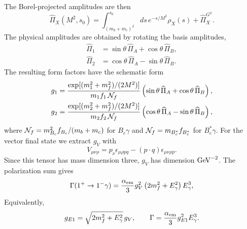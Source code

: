 \documentclass[aps,prd,preprint,nofootinbib,superscriptaddress]{revtex4-2}
\newcommand{\Bc}{B_c}
\newcommand{\Bcst}{B_c^\ast}
\begin{document}
\begin{table}[t]
\centering
\caption{Coefficients entering Eq.~\eqref{eq:rho-master}.  The labels \(P\)
and \(V\) denote the pseudoscalar and vector final state, respectively.}
\scriptsize
\setlength{\tabcolsep}{4pt}
\label{tab:rho-coeffs}
\end{table}

The Borel-projected amplitudes are then
\[
\widehat\Pi_X(M^2,s_0)=
\int_{(m_b+m_c)^2}^{s_0}ds\,e^{-s/M^2}\rho_X(s)+\widehat\Pi_X^{G^2}.
\]
The physical amplitudes are obtained by rotating the basis amplitudes,
\begin{align}
  \widehat\Pi_1 &= \sin\theta\,\widehat\Pi_A+\cos\theta\,\widehat\Pi_B,\\
  \widehat\Pi_2 &= \cos\theta\,\widehat\Pi_A-\sin\theta\,\widehat\Pi_B .
  \label{eq:rotate-pi}
\end{align}
The resulting form factors have the schematic form
\begin{align}
  g_1 &=
  \frac{\exp[(m_1^2+m_f^2)/(2M^2)]}{m_1 f_1\,{\cal N}_f}
  \left(\sin\theta\,\widehat\Pi_A+\cos\theta\,\widehat\Pi_B\right),\\
  g_2 &=
  \frac{\exp[(m_2^2+m_f^2)/(2M^2)]}{m_2 f_2\,{\cal N}_f}
  \left(\cos\theta\,\widehat\Pi_A-\sin\theta\,\widehat\Pi_B\right),
  \label{eq:sumrule-form}
\end{align}
where \({\cal N}_f=m_{\Bc}^2 f_{\Bc}/(m_b+m_c)\) for \(\Bc\gamma\) and
\({\cal N}_f=m_{\Bcst}f_{\Bcst}\) for \(\Bcst\gamma\).
For the vector final state we extract \(g_V\) with
\[
V_{\mu\nu\rho}=p_\nu\epsilon_{\mu\rho pq}
-(p\cdot q)\epsilon_{\mu\nu\rho p}.
\]
Since this tensor has mass dimension three, \(g_V\) has dimension
\({\rm GeV}^{-2}\).  The polarization sum gives
\[
\Gamma(1^+\to1^-\gamma)=
\frac{\alpha_{\rm em}}{3}g_V^2
\left(2m_f^2+E_\gamma^2\right)E_\gamma^3,
\]
Equivalently,
\[
g_{E1}=\sqrt{2m_f^2+E_\gamma^2}\,g_V,\qquad
\Gamma=\frac{\alpha_{\rm em}}{3}g_{E1}^2E_\gamma^3 .
\]
\end{document}
